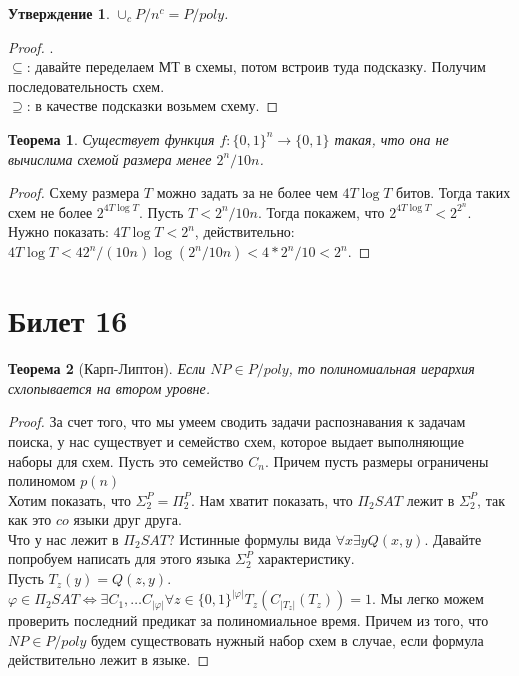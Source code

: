 \documentclass[12pt, letterpaper]{article}
\newtheorem{theorem}{Теорема}[section]
\newtheorem{prop}{Утверждение}[section]
\newcommand{\ph}{\varphi}
\begin{document}
\begin{prop}
$\cup_{c} P / n^c = P / poly$.
\end{prop}
\begin{proof}.\\
$\subseteq$: давайте переделаем МТ в схемы, потом встроив туда подсказку. Получим последовательность схем. \\
$\supseteq$: в качестве подсказки возьмем схему.
\end{proof}
          
\begin{theorem} Существует функция $f : \{0, 1\}^n \rightarrow \{0, 1\}$ такая, что она не вычислима схемой размера менее $2^n / 10n$.
\end{theorem}

\begin{proof}
Схему размера $T$ можно задать за не более чем $4T \log T$ битов. Тогда таких схем не более $2^{4 T \log T}$. Пусть $T < 2^n / 10n$. Тогда покажем, что $2^{4 T \log T} < 2^{2^n}$. Нужно показать: $4 T \log T < 2^n$, действительно: $4 T \log T < 4 2^n/(10n) \log(2^n/10n) < 4 * 2^n / 10 < 2^n$. 
\end{proof}

\section{Билет 16}
\begin{theorem}[Карп-Липтон]
Если $NP \in P/poly$, то полиномиальная иерархия схлопывается на втором уровне.
\end{theorem}
\begin{proof}
За счет того, что мы умеем сводить задачи распознавания к задачам поиска, у нас существует и семейство схем, которое выдает выполняющие наборы для схем. Пусть это семейство $C_n$. Причем пусть размеры ограничены полиномом $p(n)$\\
Хотим показать, что $\Sigma^P_2 = \Pi^P_2$. Нам хватит показать, что $\Pi_2 SAT$ лежит в $\Sigma^P_2$, так как это $co$ языки друг друга.\\
Что у нас лежит в $\Pi_2 SAT$? Истинные формулы вида $\forall x \exists y Q(x, y)$. Давайте попробуем написать для этого языка $\Sigma^P_2$ характеристику.\\
Пусть $T_z(y) = Q(z, y)$.\\
$\ph \in \Pi_2 SAT \Longleftrightarrow \exists C_1, \ldots C_{|\ph|} \forall z \in \{0,1\}^{|\ph|} T_{z} (C_{|T_{z}|} (T_z)) = 1 $. Мы легко можем проверить последний предикат за полиномиальное время. Причем из того, что $NP \in P/poly$ будем существовать нужный набор схем в случае, если формула действительно лежит в языке.
\end{proof}
\end{document}
